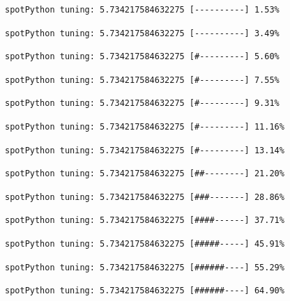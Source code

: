 \documentclass[
  letterpaper,
  DIV=11,
  numbers=noendperiod]{scrreprt}
\begin{document}
\begin{verbatim}
spotPython tuning: 5.734217584632275 [----------] 1.53% 
\end{verbatim}

\begin{verbatim}
spotPython tuning: 5.734217584632275 [----------] 3.49% 
\end{verbatim}

\begin{verbatim}
spotPython tuning: 5.734217584632275 [#---------] 5.60% 
\end{verbatim}

\begin{verbatim}
spotPython tuning: 5.734217584632275 [#---------] 7.55% 
\end{verbatim}

\begin{verbatim}
spotPython tuning: 5.734217584632275 [#---------] 9.31% 
\end{verbatim}

\begin{verbatim}
spotPython tuning: 5.734217584632275 [#---------] 11.16% 
\end{verbatim}

\begin{verbatim}
spotPython tuning: 5.734217584632275 [#---------] 13.14% 
\end{verbatim}

\begin{verbatim}
spotPython tuning: 5.734217584632275 [##--------] 21.20% 
\end{verbatim}

\begin{verbatim}
spotPython tuning: 5.734217584632275 [###-------] 28.86% 
\end{verbatim}

\begin{verbatim}
spotPython tuning: 5.734217584632275 [####------] 37.71% 
\end{verbatim}

\begin{verbatim}
spotPython tuning: 5.734217584632275 [#####-----] 45.91% 
\end{verbatim}

\begin{verbatim}
spotPython tuning: 5.734217584632275 [######----] 55.29% 
\end{verbatim}

\begin{verbatim}
spotPython tuning: 5.734217584632275 [######----] 64.90% 
\end{verbatim}
\end{document}
